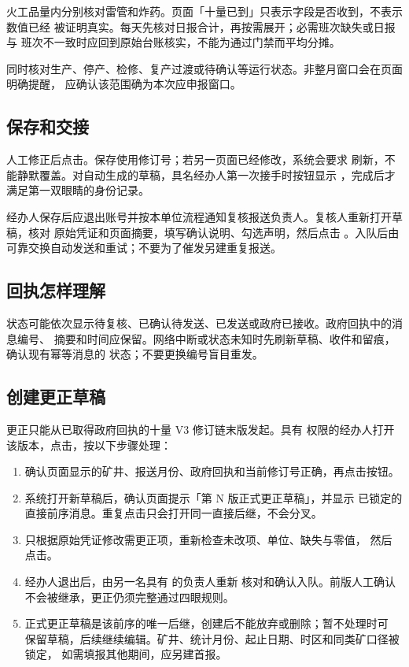\documentclass[UTF8,openany,zihao=-4,fontset=none]{ctexbook}
\begin{document}
火工品量内分别核对雷管和炸药。页面「十量已到」只表示字段是否收到，不表示数值已经
被证明真实。每天先核对日报合计，再按需展开；必需班次缺失或日报与
班次不一致时应回到原始台账核实，不能为通过门禁而平均分摊。

同时核对生产、停产、检修、复产过渡或待确认等运行状态。非整月窗口会在页面明确提醒，
应确认该范围确为本次应申报窗口。

\subsection{保存和交接}

人工修正后点击。保存使用修订号；若另一页面已经修改，系统会要求
刷新，不能静默覆盖。对自动生成的草稿，具名经办人第一次接手时按钮显示
，完成后才满足第一双眼睛的身份记录。

经办人保存后应退出账号并按本单位流程通知复核报送负责人。复核人重新打开草稿，核对
原始凭证和页面摘要，填写确认说明、勾选声明，然后点击
。入队后由可靠交换自动发送和重试；不要为了催发另建重复报送。

\subsection{回执怎样理解}

状态可能依次显示待复核、已确认待发送、已发送或政府已接收。政府回执中的消息编号、
摘要和时间应保留。网络中断或状态未知时先刷新草稿、收件和留痕，确认现有幂等消息的
状态；不要更换编号盲目重发。

\subsection{创建更正草稿}

更正只能从已取得政府回执的十量 V3 修订链末版发起。具有
 权限的经办人打开该版本，点击，按以下步骤处理：

\begin{enumerate}
  \item 确认页面显示的矿井、报送月份、政府回执和当前修订号正确，再点击按钮。
  \item 系统打开新草稿后，确认页面提示「第 N 版正式更正草稿」，并显示
  已锁定的直接前序消息。重复点击只会打开同一直接后继，不会分叉。
	\item 只根据原始凭证修改需更正项，重新检查未改项、单位、缺失与零值，
  然后点击。
  \item 经办人退出后，由另一名具有  的负责人重新
	  核对和确认入队。前版人工确认不会被继承，更正仍须完整通过四眼规则。
	\item 正式更正草稿是该前序的唯一后继，创建后不能放弃或删除；暂不处理时可
	  保留草稿，后续继续编辑。矿井、统计月份、起止日期、时区和同类矿口径被锁定，
	  如需填报其他期间，应另建首报。
\end{enumerate}
\end{document}
